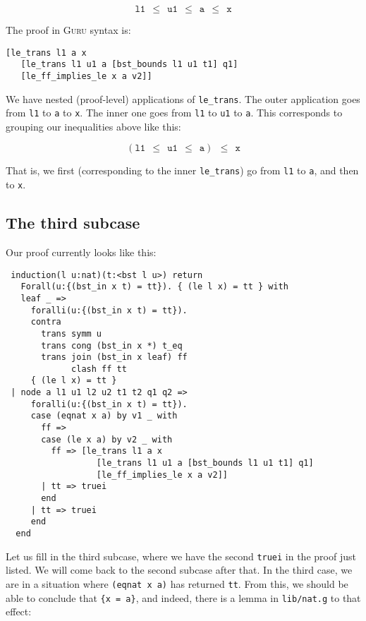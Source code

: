 \documentclass{book}[12pt]
\newcommand{\guru}[0]{\textsc{Guru}\xspace}
\begin{document}
\[ \texttt{l1} \ \ \le\ \ \texttt{u1} \ \ \le \ \ \texttt{a} \ \ \le \ \ \texttt{x} \]

\noindent The proof in \guru syntax is:

\begin{verbatim}
[le_trans l1 a x 
   [le_trans l1 u1 a [bst_bounds l1 u1 t1] q1]
   [le_ff_implies_le x a v2]]
\end{verbatim}

\noindent We have nested (proof-level) applications of
\texttt{le\_trans}.  The outer application goes from \texttt{l1} to
\texttt{a} to \texttt{x}.  The inner one goes from \texttt{l1} to
\texttt{u1} to \texttt{a}.  This corresponds to grouping our
inequalities above like this:

\[ (\texttt{l1} \ \ \le\ \ \texttt{u1} \ \ \le \ \ \texttt{a}) \ \ \le \ \ \texttt{x} \]

\noindent That is, we first (corresponding to the inner
\texttt{le\_trans}) go from \texttt{l1} to \texttt{a}, and then to
\texttt{x}.

\subsection{The third subcase}

Our proof currently looks like this:

\begin{verbatim}
 induction(l u:nat)(t:<bst l u>) return
   Forall(u:{(bst_in x t) = tt}). { (le l x) = tt } with
   leaf _ => 
     foralli(u:{(bst_in x t) = tt}).
     contra
       trans symm u
       trans cong (bst_in x *) t_eq
       trans join (bst_in x leaf) ff
             clash ff tt
     { (le l x) = tt }
 | node a l1 u1 l2 u2 t1 t2 q1 q2 => 
     foralli(u:{(bst_in x t) = tt}).
     case (eqnat x a) by v1 _ with
       ff =>
       case (le x a) by v2 _ with
         ff => [le_trans l1 a x 
                  [le_trans l1 u1 a [bst_bounds l1 u1 t1] q1]
                  [le_ff_implies_le x a v2]]
       | tt => truei
       end
     | tt => truei
     end
  end
\end{verbatim}

\noindent Let us fill in the third subcase, where we have the second
\texttt{truei} in the proof just listed.  We will come back to the
second subcase after that.  In the third case, we are in a situation
where \texttt{(eqnat x a)} has returned \texttt{tt}.  From this, we
should be able to conclude that \texttt{\{x = a\}}, and indeed, there
is a lemma in \texttt{lib/nat.g} to that effect:
\end{document}
